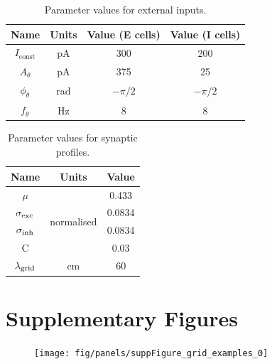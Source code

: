 \documentclass[a4paper,12pt]{article}
\newcommand{\ssc}[3]{\ensuremath{#1_{\text{#2}_{\text{#3}}}}}
\newcommand{\Iconst}   {\ssc{I}      {const} {}}
\newcommand{\Atheta}   {\ssc{A}      {$\theta$}{}}
\newcommand{\ftheta}   {\ssc{f}      {$\theta$}{}}
\newcommand{\phitheta} {\ssc{\phi}   {$\theta$}{}}
\newcommand{\sigmasub}[1]{\ssc{\sigma}{\scriptsize{#1}}{}}
\newcommand{\lamgrid}{\ssc{\lambda}{\scriptsize{grid}}{}}
\begin{document}
\begin{table}
    \centering
    \begin{tabular}{| c | c | c | c |}
        \hline
        Name       & Units & Value (E cells) & Value (I cells) \\
        \hline\hline
        $\Iconst$  & pA    & 300             & 200             \\
        $\Atheta$  & pA    & 375             & 25              \\
        $\phitheta$& rad   & $-\pi/2$        & $-\pi/2$        \\
        $\ftheta$  & Hz    & 8               & 8               \\
        \hline
    \end{tabular}
    \caption{Parameter values for external inputs.}
\end{table}

\begin{table}
    \centering
    \begin{tabular}{| c | c | c |}
        \hline
        Name              & Units                        & Value   \\
        \hline\hline
        $\mu$             & \multirow{4}{*}{normalised}  & 0.433   \\
        $\sigmasub{exc}$  &                              & 0.0834  \\
        $\sigmasub{inh}$  &                              & 0.0834  \\
        C                 &                              & 0.03    \\
        \lamgrid          & cm                           & 60      \\
        \hline
    \end{tabular}
    \caption{Parameter values for synaptic profiles.}
    \label{tab:params_syn}
\end{table}






\clearpage

\section*{Supplementary Figures}

\setcounter{figure}{0}
\renewcommand{\figurename}{Supplementary Figure}


\begin{figure}[h!]
    \texttt{[image: fig/panels/suppFigure\_grid\_examples\_0]}
\end{figure}
\end{document}
